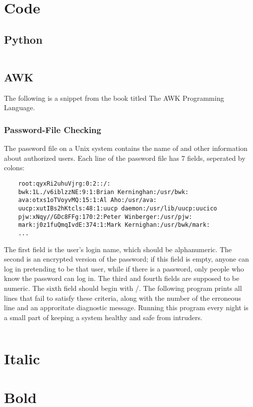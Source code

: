 \section{Code}
\subsection{Python}
\inputminted{python}{code/ttf-to-otp.py}

\subsection{AWK}
The following is a snippet from the book titled The AWK Programming Language.

\subsubsection{Password-File Checking}
The password file on a Unix system contains the name of and other information
about authorized users. Each line of the password file has 7 fields, seperated
by colons:
\small\begin{verbatim}
    root:qyxRi2uhuVjrg:0:2::/:
    bwk:1L./v6iblzzNE:9:1:Brian Kerninghan:/usr/bwk:
    ava:otxs1oTVoyvMQ:15:1:Al Aho:/usr/ava:
    uucp:xutIBs2hKtcls:48:1:uucp daemon:/usr/lib/uucp:uucico
    pjw:xNqy//GDc8FFg:170:2:Peter Winberger:/usr/pjw:
    mark:j0z1fuQmqIvdE:374:1:Mark Kernighan:/usr/bwk/mark:
    ...
\end{verbatim}
\normalsize
The first field is the user's login name, which should be alphanumeric. The
second is an encrypted version of the password; if this field is empty, anyone
can log in pretending to be that user, while if there is a password, only
people who know the password can log in. The third and fourth fields are
supposed to be numeric. The sixth field should begin with /. The following
program prints all lines that fail to satisfy these criteria, along with the
number of the erroneous line and an approritate diagnostic message. Running
this program every night is a small part of keeping a system healthy and safe
from intruders.

\inputminted{awk}{code/password-check.awk}

\section{Italic}
\textit{\lipsum[2]}

\section{Bold}
\textbf{\lipsum[4]}
